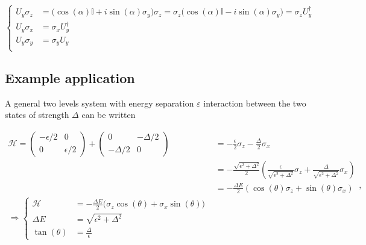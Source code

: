  \begin{equation}\label{uniComm1}
   \left\lbrace\begin{aligned}
       U_{y}\sigma_z & = \bigg(\cos(\alpha)\mathbb{I}+i\sin(\alpha)\sigma_y\bigg)\sigma_z = \sigma_z\bigg(\cos(\alpha)\mathbb{I}-i\sin(\alpha)\sigma_y\bigg) = \sigma_zU_y^{\dagger}\\
       U_{y}\sigma_x & = \sigma_xU_y^{\dagger}\\
       U_{y}\sigma_y & = \sigma_yU_y\\
     \end{aligned}\right.
 \end{equation}

 \subsection{Example application\label{subsec:ExampleApplication}}
 A  general  two  levels  system  with  energy  separation  $ \varepsilon  $  interaction  between  the  two  states  of  strength
 $ \Delta $ can be written

 \begin{equation}
   \label{l1-uni}
   \begin{aligned}
     \mathcal{H} = \left(\begin{matrix} -\epsilon/2 & 0\\ 0 & \epsilon/2
       \end{matrix}\right) + \begin{pmatrix}
       0 & -\Delta/2\\-\Delta/2 & 0
     \end{pmatrix} & = {-\frac{\epsilon}{2}\sigma_z-\frac{\Delta}{2}\sigma_x}\\
     & = -\frac{\sqrt{\epsilon^2+\Delta^2}}{2}\left(\frac{\epsilon}{\sqrt{\epsilon^2+\Delta^2}}\sigma_z+\frac{\Delta}{\sqrt{\epsilon^2+\Delta^2}}\sigma_x\right)\\
     & = -\frac{\Delta E}{2}\left(\cos\left(\theta\right)\sigma_z+\sin\left(\theta\right)\sigma_x\right)\\
     {\Rightarrow \left\lbrace\begin{aligned}
           \mathcal{H} & = -\frac{\Delta E}{2}\big(\sigma_z\cos(\theta)+\sigma_x\sin(\theta)\big)\\
           \Delta E & = \sqrt{\epsilon^2+\Delta^2}\\
           \tan(\theta) & = \frac{\Delta}{\epsilon}
         \end{aligned}\right.}
   \end{aligned},
 \end{equation}

